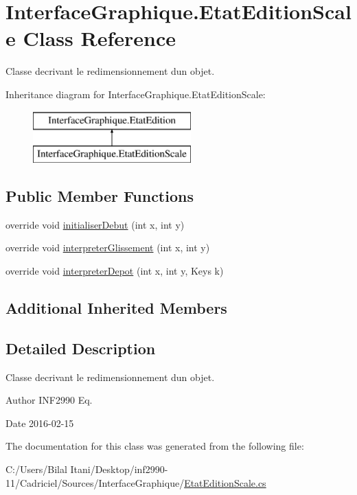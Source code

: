 \hypertarget{class_interface_graphique_1_1_etat_edition_scale}{}\section{Interface\+Graphique.\+Etat\+Edition\+Scale Class Reference}
\label{class_interface_graphique_1_1_etat_edition_scale}


Classe decrivant le redimensionnement d\textquotesingle{}un objet.  


Inheritance diagram for Interface\+Graphique.\+Etat\+Edition\+Scale\+:\begin{figure}[H]
\begin{center}
\leavevmode
\includegraphics[height=2.000000cm]{class_interface_graphique_1_1_etat_edition_scale}
\end{center}
\end{figure}
\subsection*{Public Member Functions}
\begin{DoxyCompactItemize}
\item 
override void \hyperlink{group__inf2990_ga057a0ff30fb70346d9e0ddb1d5ac1b8b}{initialiser\+Debut} (int x, int y)
\item 
override void \hyperlink{group__inf2990_ga712e07a2dcedbeed91dbeba8223c5346}{interpreter\+Glissement} (int x, int y)
\item 
override void \hyperlink{group__inf2990_ga4160cdd47c40c9bd4879240c34e3c459}{interpreter\+Depot} (int x, int y, Keys k)
\end{DoxyCompactItemize}
\subsection*{Additional Inherited Members}


\subsection{Detailed Description}
Classe decrivant le redimensionnement d\textquotesingle{}un objet. 

\begin{DoxyAuthor}{Author}
I\+N\+F2990 Eq. 
\end{DoxyAuthor}
\begin{DoxyDate}{Date}
2016-\/02-\/15 
\end{DoxyDate}


The documentation for this class was generated from the following file\+:\begin{DoxyCompactItemize}
\item 
C\+:/\+Users/\+Bilal Itani/\+Desktop/inf2990-\/11/\+Cadriciel/\+Sources/\+Interface\+Graphique/\hyperlink{_etat_edition_scale_8cs}{Etat\+Edition\+Scale.\+cs}\end{DoxyCompactItemize}
